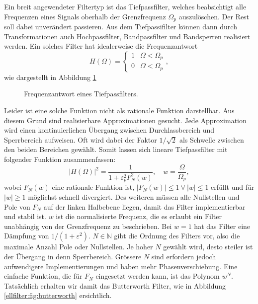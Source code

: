 Ein breit angewendeter Filtertyp ist das Tiefpassfilter, welches beabsichtigt alle Frequenzen eines Signals oberhalb der Grenzfrequenz $\Omega_p$ auszulöschen.
Der Rest soll dabei unverändert passieren.
Aus dem Tiefpassifilter können dann durch Transformationen auch Hochpassfilter, Bandpassfilter und Bandsperren realisiert werden.
Ein solches Filter hat idealerweise die Frequenzantwort
\begin{equation}
    H(\Omega) =
    \begin{cases}
        1  & \Omega < \Omega_p \\
        0  & \Omega < \Omega_p
    \end{cases},
\end{equation}
wie dargestellt in Abbildung \ref{ellfilter:fig:lp}
\begin{figure}
    \centering
    
    \caption{Frequenzantwort eines Tiefpassfilters.}
    \label{ellfilter:fig:lp}
\end{figure}
Leider ist eine solche Funktion nicht als rationale Funktion darstellbar.
Aus diesem Grund sind realisierbare Approximationen gesucht.
Jede Approximation wird einen kontinuierlichen Übergang zwischen Durchlassbereich und Sperrbereich aufweisen.
Oft wird dabei der Faktor $1/\sqrt{2}$ als Schwelle zwischen den beiden Bereichen gewählt.
Somit lassen sich lineare Tiefpassfilter mit folgender Funktion zusammenfassen:
\begin{equation}
    | H(\Omega)|^2 = \frac{1}{1 + \varepsilon_p^2 F_N^2(w)}, \quad w=\frac{\Omega}{\Omega_p},
\end{equation}
wobei $F_N(w)$ eine rationale Funktion ist, $|F_N(w)| \leq 1 ~\forall~ |w| \leq 1$ erfüllt und für $|w| \geq 1$ möglichst schnell divergiert.
Des weiteren müssen alle Nullstellen und Pole von $F_N$ auf der linken Halbebene liegen, damit das Filter implementierbar und stabil ist.
$w$ ist die normalisierte Frequenz, die es erlaubt ein Filter unabhängig von der Grenzfrequenz zu beschrieben.
Bei $w=1$ hat das Filter eine Dämpfung von $1/(1+\varepsilon^2)$.
$N \in \mathbb{N} $ gibt die Ordnung des Filters vor, also die maximale Anzahl Pole oder Nullstellen.
Je hoher $N$ gewählt wird, desto steiler ist der Übergang in denn Sperrbereich.
Grössere $N$ sind erfordern jedoch aufwendigere Implementierungen und haben mehr Phasenverschiebung.
Eine einfache Funktion, die für $F_N$ eingesetzt werden kann, ist das Polynom $w^N$.
Tatsächlich erhalten wir damit das Butterworth Filter, wie in Abbildung \ref{ellfilter:fig:butterworth} ersichtlich.
